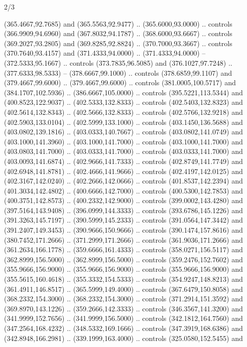 \begin{flagdescription}{2/3}
\begin{scope}[xshift=0.5\flaglength,yshift=0.5\flagwidth,scale=\flagwidth/525.28]
\begin{scope}[y=0.1mm, x=0.1mm, yscale=-1,shift={(-381.5,-404)}]
\begin{scope}[shift={(5.25001,4.53053)},miter limit=4.00,line width=0.800\lw]
  (365.4667,92.7685) and (365.5563,92.9477) .. (365.6000,93.0000) .. controls
  (366.9909,94.6960) and (367.8032,94.1787) .. (368.6000,93.6667) .. controls
  (369.2027,93.2805) and (369.8285,92.8824) .. (370.7000,93.3667) .. controls
  (370.7640,93.4157) and (371.4333,94.0000) .. (371.4333,94.0000) --
  (372.5333,95.1667) .. controls (373.7835,96.5085) and (376.1027,97.7248) ..
  (377.6333,98.5333) -- (378.6667,99.1000) .. controls (378.6859,99.1107) and
  (379.4667,99.6000) .. (379.4667,99.6000) .. controls (381.0005,100.5717) and
  (384.1707,102.5936) .. (386.6667,105.0000) .. controls (395.5221,113.5344) and
  (400.8523,122.9037) .. (402.5333,132.8333) .. controls (402.5403,132.8323) and
  (402.5614,132.8343) .. (402.5666,132.8333) .. controls (402.5766,132.9218) and
  (402.5903,133.0104) .. (402.5999,133.1000) .. controls (403.1450,136.5688) and
  (403.0802,139.1816) .. (403.0333,140.7667) .. controls (403.0802,141.0749) and
  (403.1000,141.3960) .. (403.1000,141.7000) .. controls (403.1000,141.7000) and
  (403.0803,141.7000) .. (403.0333,141.7000) .. controls (403.0333,141.7000) and
  (403.0093,141.6874) .. (402.9666,141.7333) .. controls (402.8749,141.7749) and
  (402.6948,141.8781) .. (402.4666,141.9666) .. controls (402.4197,142.0125) and
  (402.3167,142.0240) .. (402.2666,142.0666) .. controls (401.8537,142.2394) and
  (401.3034,142.4802) .. (400.6666,142.7000) .. controls (400.5300,142.7853) and
  (400.3751,142.8573) .. (400.2332,142.9000) .. controls (399.0002,143.4280) and
  (397.5164,143.9408) .. (396.0999,144.3333) .. controls (393.6786,145.1226) and
  (391.3263,145.7197) .. (390.5999,145.2333) .. controls (391.0564,147.3442) and
  (391.2407,149.3453) .. (390.9666,150.9666) .. controls (390.1474,157.8616) and
  (380.7452,171.2666) .. (371.2999,171.2666) .. controls (361.9036,171.2666) and
  (361.2634,166.1778) .. (359.6666,161.4333) .. controls (358.0271,156.5117) and
  (362.8999,156.5000) .. (362.8999,156.5000) .. controls (359.2476,152.7602) and
  (355.9666,156.9000) .. (355.9666,156.9000) .. controls (355.9666,156.9000) and
  (355.5615,160.4618) .. (355.3332,154.5333) .. controls (354.9247,148.8213) and
  (361.4911,146.8517) .. (365.5999,149.4000) .. controls (367.6479,150.8058) and
  (368.2332,154.3000) .. (368.2332,154.3000) .. controls (371.2914,151.3592) and
  (369.8970,143.1226) .. (359.2666,142.3333) .. controls (346.3567,141.3200) and
  (341.9999,152.7656) .. (341.9999,156.5000) .. controls (342.1812,164.7560) and
  (347.2564,168.4232) .. (348.5332,169.1666) .. controls (347.3919,168.6386) and
  (342.8948,166.2981) .. (339.1999,163.4000) .. controls (325.0580,152.5455) and

\end{scope}
\end{scope}
\end{scope}
\end{flagdescription}
